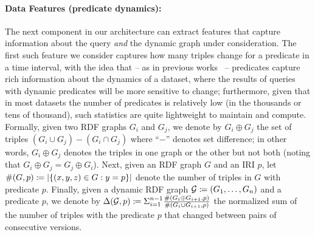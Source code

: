 \documentclass[runningheads]{llncs}
\newcommand{\da}{\ensuremath{:\nolinebreak\mkern-1.2mu\nolinebreak=}}
\begin{document}
\paragraph{Data Features (predicate dynamics):} The next component in our architecture can extract features that capture information about the query \textit{and} the dynamic graph under consideration.  The first such feature we consider captures how many triples change for a predicate in a time interval, with the idea that -- as in previous works~\cite{UmbrichKHP12,UmbrichKPPH12,ekawUmbrichKHP12,DehghanzadehPKUHD14} -- predicates capture rich information about the dynamics of a dataset, where the results of queries with dynamic predicates will be more sensitive to change; furthermore, given that in most datasets the number of predicates is relatively low (in the thousands or tens of thousand), such statistics are quite lightweight to maintain and compute. Formally, given two RDF graphs $G_i$ and $G_j$, we denote by $G_i \oplus G_j$ the set of triples $(G_i \cup G_j) - (G_i \cap G_j)$ where ``$-$'' denotes set difference; in other words, $G_i \oplus G_j$ denotes the triples in one graph or the other but not both (noting that $G_i \oplus G_j = G_j \oplus G_i$). Next, given an RDF graph $G$ and an IRI $p$, let $\#(G,p) \da |\{(x,y,z) \in G : y = p \}|$ denote the number of triples in $G$ with predicate $p$. Finally, given a dynamic RDF graph $\mathcal{G} \da ( G_1, \ldots, G_n )$ and a predicate $p$, we denote by $\Delta(\mathcal{G},p) \da \Sigma_{i=1}^{n-1}\frac{\#(G_i \oplus G_{i+1},p)}{\#(G_i \cup G_{i+1},p)}$ the normalized sum of the number of triples with the predicate $p$ that changed between pairs of consecutive versions.
\end{document}
